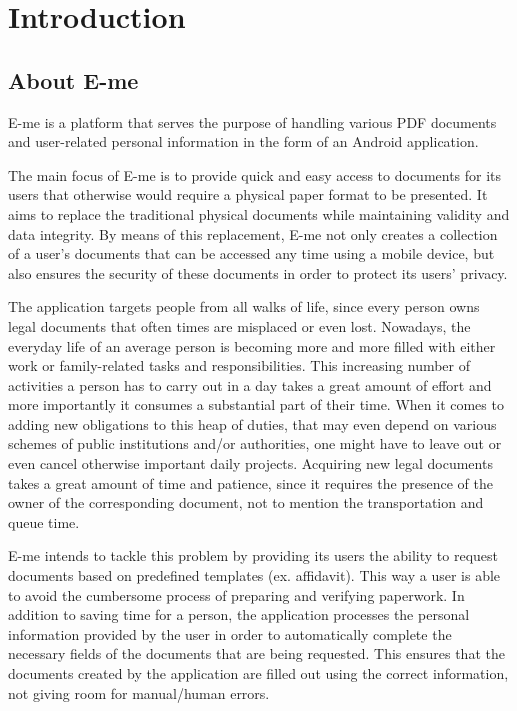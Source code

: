 \chapter{Introduction}\label{ch:INTRO}

\section{About E-me}\label{sec:INTRO:about}

E-me is a platform that serves the purpose of handling various PDF documents and user-related personal information in the form of an Android application.

The main focus of E-me is to provide quick and easy access to documents for its users that otherwise would require a physical paper format to be presented.
It aims to replace the traditional physical documents while maintaining validity and data integrity.
By means of this replacement, E-me not only creates a collection of a user's documents that can be accessed any time using a mobile device, but also
ensures the security of these documents in order to protect its users' privacy.

The application targets people from all walks of life, since every person owns legal documents that often times are misplaced or even lost.
Nowadays, the everyday life of an average person is becoming more and more filled with either work or family-related tasks and responsibilities.
This increasing number of activities a person has to carry out in a day takes a great amount of effort and more importantly it consumes a substantial part
of their time.
When it comes to adding new obligations to this heap of duties, that may even depend on various schemes of public institutions and/or authorities,
one might have to leave out or even cancel otherwise important daily projects.
Acquiring new legal documents takes a great amount of time and patience, since it requires the presence of the owner of the corresponding document, 
not to mention the transportation and queue time.

E-me intends to tackle this problem by providing its users the ability to request documents based on predefined templates (ex. affidavit).
This way a user is able to avoid the cumbersome process of preparing and verifying paperwork.
In addition to saving time for a person, the application processes the personal information provided by the user in order to 
automatically complete the necessary fields of the documents that are being requested.
This ensures that the documents created by the application are filled out using the correct information, not giving room for manual/human errors.


